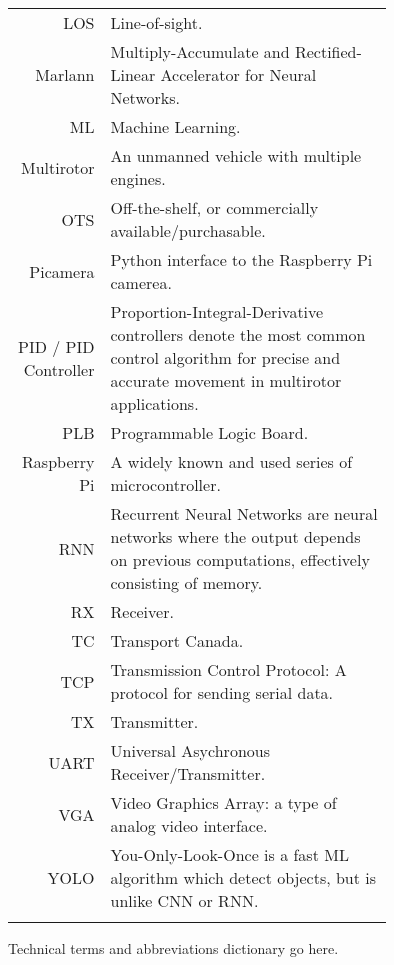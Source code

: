 \begin{tabular}[h]{rp{0.75\linewidth}}
    LOS & Line-of-sight.\\
    Marlann & Multiply-Accumulate and Rectified-Linear Accelerator for Neural Networks. \\
    ML & Machine Learning.\\
    Multirotor & An unmanned vehicle with multiple engines. \\
    OTS & Off-the-shelf, or commercially available/purchasable. \\
    Picamera & Python interface to the Raspberry Pi camerea. \\
    PID / PID Controller & Proportion-Integral-Derivative controllers denote the most common control algorithm for precise and accurate movement in multirotor applications.\cite{pid}\\
    PLB & Programmable Logic Board. \\
    Raspberry Pi & A widely known and used series of microcontroller. \\
    RNN & Recurrent Neural Networks are neural networks where the output depends on previous computations, effectively consisting of memory.\cite{rnn}\\
    RX & Receiver.\\
    TC & Transport Canada.\\
    TCP & Transmission Control Protocol: A protocol for sending serial data. \\
    TX & Transmitter.\\\
    UART & Universal Asychronous Receiver/Transmitter. \\
    VGA & Video Graphics Array: a type of analog video interface. \\
    YOLO & You-Only-Look-Once is a fast ML algorithm which detect objects, but is unlike CNN or RNN.\cite{yolo}\cite{yolo-2}\\
     & \\

    \hline

\end{tabular}

Technical terms and abbreviations dictionary go here.
